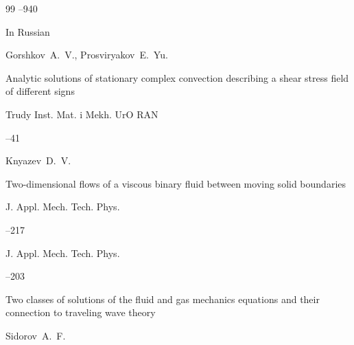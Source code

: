 \begin{thebibliography}{99}
--940




\lang In Russian

\by Gorshkov~A.~V., Prosviryakov~E.~Yu.

\paper Analytic solutions of stationary complex convection describing a shear stress field of different signs

\serial Trudy Inst. Mat. i Mekh. UrO RAN




--41





\by Knyazev~D.~V.

\paper Two-dimensional flows of a viscous binary fluid between moving solid boundaries

\jour J. Appl. Mech. Tech. Phys.




--217









\jour J. Appl. Mech. Tech. Phys. 





–203 

\paper Two classes of solutions of the fluid and gas mechanics equations and their connection to traveling wave theory

\by Sidorov~A.~F.










\end{thebibliography}
